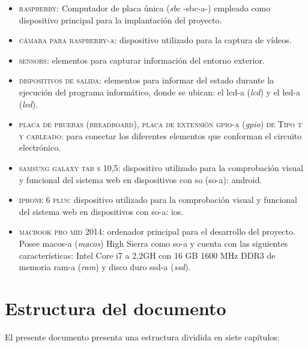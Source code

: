 \documentclass[12pt,a4paper, twoside]{report}
\begin{document}
\begin{itemize}
		\begin{itemize}
			\item \textsc{\gls{raspberry}:} Computador de placa única (\textit{\gls{sbc}} -\gls{sbc-a}-) empleado como dispositivo principal para la implantación del proyecto.
			\item \textsc{cámara para \gls{raspberry-a}:} dispositivo utilizado para la captura de vídeos.
			\item \textsc{\glspl{sensor}:} elementos para capturar información del entorno exterior.
			\item \textsc{dispositivos de salida:} elementos para informar del estado durante la ejecución del programa informático, donde se ubican: el \gls{lcd-a} (\textit{\gls{lcd}}) y el \gls{led-a} (\textit{\gls{led}}).
			\item \textsc{placa de pruebas (\gls{breadboard}), placa de extensión \gls{gpio-a}} (\textit{\gls{gpio}}) \textsc{de Tipo t y cableado:} para conectar los diferentes elementos que conforman el circuito electrónico.
			\item \textsc{samsung galaxy tab s 10,5:} dispositivo utilizado para la comprobación visual y funcional del sistema web en dispositivos con \gls{so} (\gls{so-a}): \gls{android}.
			\item \textsc{iphone 6 plus:} dispositivo utilizado para la comprobación visual y funcional del sistema web en dispositivos con \gls{so-a}: \gls{ios}.
			\item \textsc{macbook pro mid 2014:} ordenador principal para el desarrollo del proyecto. Posee \gls{macos-a} (\textit{\gls{macos}}) High Sierra como \gls{so-a} y cuenta con las siguientes características: Intel Core i7 a 2,2GH con 16 GB 1600 MHz DDR3 de memoria \gls{ram-a} (\textit{\gls{ram}}) y disco duro \gls{ssd-a} (\textit{\gls{ssd}}).
		\end{itemize}

	\end{itemize}

	\newpage
	
	\section{Estructura del documento}

	El presente documento presenta una estructura dividida en siete capítulos: 
		
\end{document}

